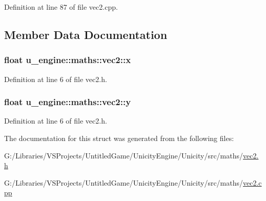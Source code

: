 Definition at line 87 of file vec2.\+cpp.



\subsection{Member Data Documentation}
\hypertarget{structu__engine_1_1maths_1_1vec2_a25400d4a0d4e8bf5a24fd3a3e2073d4a}{}
\subsubsection[{x}]{\setlength{\rightskip}{0pt plus 5cm}float u\+\_\+engine\+::maths\+::vec2\+::x}\label{structu__engine_1_1maths_1_1vec2_a25400d4a0d4e8bf5a24fd3a3e2073d4a}


Definition at line 6 of file vec2.\+h.

\hypertarget{structu__engine_1_1maths_1_1vec2_acf03e4690998267ec3c7b6e957746355}{}
\subsubsection[{y}]{\setlength{\rightskip}{0pt plus 5cm}float u\+\_\+engine\+::maths\+::vec2\+::y}\label{structu__engine_1_1maths_1_1vec2_acf03e4690998267ec3c7b6e957746355}


Definition at line 6 of file vec2.\+h.



The documentation for this struct was generated from the following files\+:\begin{DoxyCompactItemize}
\item 
G\+:/\+Libraries/\+V\+S\+Projects/\+Untitled\+Game/\+Unicity\+Engine/\+Unicity/src/maths/\hyperlink{vec2_8h}{vec2.\+h}\item 
G\+:/\+Libraries/\+V\+S\+Projects/\+Untitled\+Game/\+Unicity\+Engine/\+Unicity/src/maths/\hyperlink{vec2_8cpp}{vec2.\+cpp}\end{DoxyCompactItemize}
